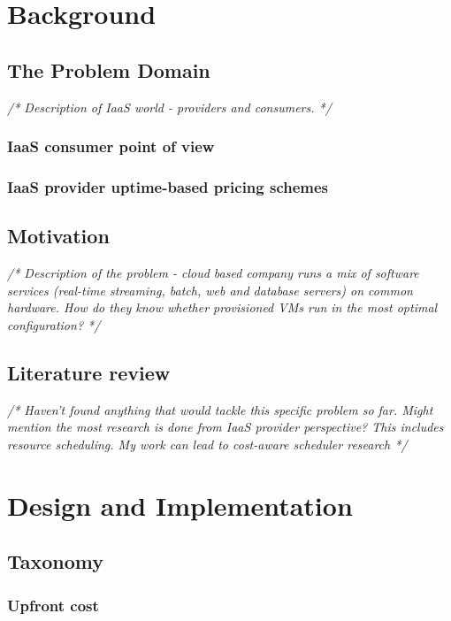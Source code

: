 \documentclass[]{final_report}
\begin{document}
\chapter{Background}

\section{The Problem Domain}
\emph{/* Description of IaaS world - providers and consumers. */}
\subsection{IaaS consumer point of view}
\subsection{IaaS provider uptime-based pricing schemes}

\section{Motivation}
\emph{ /* Description of the problem - cloud based company runs a mix of software services (real-time streaming, batch, web and database servers) on common hardware. How do they know whether provisioned VMs run in the most optimal configuration? */ }

\section{Literature review}
\emph{/* Haven't found anything that would tackle this specific problem so far. Might mention the most research is done from IaaS provider perspective? This includes resource scheduling. My work can lead to cost-aware scheduler research */}




\chapter{Design and Implementation}

\section{Taxonomy}

\subsection{Upfront cost}
\end{document}
